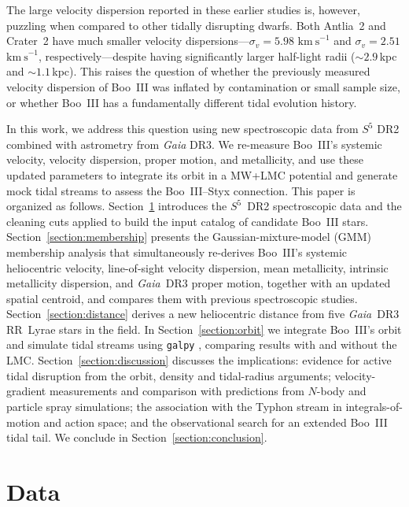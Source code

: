 \documentclass[twocolumn, apj, numberedappendix, appendixfloats]{openjournal_dhayaa}
\newcommand{\SSSSS}{${S}^5$\xspace}
\newcommand{\gaia}{\textit{Gaia}\xspace}
\newcommand{\vlosUnits}{$\mathrm{km~s}^{-1}$\xspace}
\begin{document}
The large velocity dispersion reported in these earlier studies is, however, puzzling when compared to other tidally disrupting dwarfs. Both Antlia~2 and Crater~2 have much smaller velocity dispersions---$\sigma_v = 5.98$ \vlosUnits \citep{Ji2021} and $\sigma_v = 2.51$ \vlosUnits \citep{Limberg2025}, respectively---despite having significantly larger half-light radii ($\sim 2.9$\,kpc and $\sim 1.1$\,kpc). This raises the question of whether the previously measured velocity dispersion of Boo~III was inflated by contamination or small sample size, or whether Boo~III has a fundamentally different tidal evolution history.

In this work, we address this question using new spectroscopic data from \SSSSS DR2 combined with astrometry from \gaia DR3. We re-measure Boo~III's systemic velocity, velocity dispersion, proper motion, and metallicity, and use these updated parameters to integrate its orbit in a MW+LMC potential and generate mock tidal streams to assess the Boo~III--Styx connection. This paper is organized as follows. Section~\ref{section:data} introduces the \SSSSS\ DR2 spectroscopic data and the cleaning cuts applied to build the input catalog of candidate Boo~III stars. Section~\ref{section:membership} presents the Gaussian-mixture-model (GMM) membership analysis that simultaneously re-derives Boo~III's systemic heliocentric velocity, line-of-sight velocity dispersion, mean metallicity, intrinsic metallicity dispersion, and \gaia\ DR3 proper motion, together with an updated spatial centroid, and compares them with previous spectroscopic studies. Section~\ref{section:distance} derives a new heliocentric distance from five \gaia\ DR3 RR~Lyrae stars in the field. In Section~\ref{section:orbit} we integrate Boo~III's orbit and simulate tidal streams using \texttt{galpy} \citep{Bovy2015}, comparing results with and without the LMC. Section~\ref{section:discussion} discusses the implications: evidence for active tidal disruption from the orbit, density and tidal-radius arguments; velocity-gradient measurements and comparison with predictions from $N$-body and particle spray simulations; the association with the Typhon stream in integrals-of-motion and action space; and the observational search for an extended Boo~III tidal tail. We conclude in Section~\ref{section:conclusion}.


\section{Data} \label{section:data}
\end{document}
